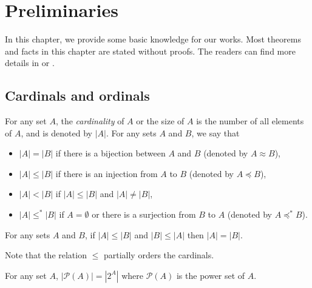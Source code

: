 \chapter{Preliminaries}


In this chapter, we provide some basic knowledge for our works. Most theorems and facts in this chapter are stated without proofs. The readers can find more details in \cite{Hal} or \cite{Jech}.

\section{Cardinals and ordinals}

 For any set $A$, the \emph{cardinality} of $A$ or the size of $A$ is the number of all elements of $A$, and is denoted by $|A|$. For any sets $A$ and $B$, we say that 
   \begin{itemize}\itemsep0em
       \item $|A|=|B|$ if there is a bijection between $A$ and $B$ (denoted by $A\approx B$),
       \item $|A|\leq|B|$ if there is an injection from $A$ to $B$ (denoted by $A\preceq B$),
       \item $|A|<|B|$ if $|A|\leq|B|$ and $|A|\neq|B|$,
       \item $|A|\leq^{*}|B|$ if $A=\emptyset$ or there is a surjection from $B$ to $A$ (denoted by $A\preceq^{*}B$).
   \end{itemize}


\begin{theorem} For any sets $A$ and $B$, if $|A|\leq|B|$ and $|B|\leq|A|$ then $|A|=|B|$.
\end{theorem}
\noindent Note that the relation $\leq$ partially orders the cardinals.

   

\begin{remark}\textup{For any set $A$,
    $|\mathcal{P}(A)|=|2^{A}|$ where $\mathcal{P}(A)$ is the power set of $A$.}
\end{remark} 


